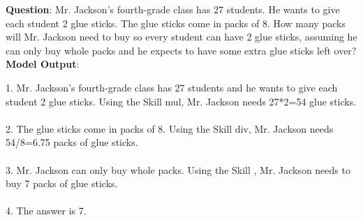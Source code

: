 \documentclass{article} \usepackage{arxiv}
\begin{document}
\begin{tcolorbox}[title = {GSM8K}, colback = Apricot!25!white, colframe = BrickRed!75!black] 
\textbf{Question}: Mr. Jackson’s fourth-grade class has 27 students. He wants to give each student 2 glue sticks. The glue sticks  come in packs of 8. How many packs will Mr. Jackson need to buy so every student can have 2 glue sticks, assuming he can only buy whole packs and he expects to have some extra glue sticks left over?
\tcblower
\textbf{Model Output}:


\quad


1. Mr. Jackson’s fourth-grade class has 27 students and he wants to give each student 2 glue sticks. Using the Skill mul, Mr. Jackson needs 27*2=54 glue sticks. \\ \\
2. The glue sticks come in packs of 8. Using the Skill div, Mr. Jackson needs 54/8=6.75  packs of glue sticks. \\ \\
3. Mr. Jackson can only buy whole packs. Using the Skill ,  Mr. Jackson needs to buy 7 packs of glue sticks.  \\ \\
4. The answer is 7.
\end{tcolorbox}
\noindent\begin{minipage}{\textwidth}
 \label{Tab:example_compose_gsm8k_skill_3}
\end{minipage}


\newpage
\end{document}
